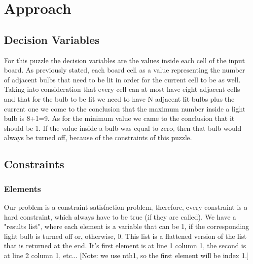 \documentclass[runningheads]{llncs}
\begin{document}
\section{Approach}

\subsection{Decision Variables}
For this puzzle the decision variables are the values inside each cell of the input board. As previously stated, each board cell as a value representing the number of adjacent bulbs that need to be lit in order for the current cell to be as well.
Taking into consideration that every cell can at most have eight adjacent cells and that for the bulb to be lit we need to have N adjacent lit bulbs plus the current one we come to the conclusion that the maximum number inside a light bulb is 8+1=9. As for the minimum value we came to the conclusion that it should be 1. If the value inside a bulb was equal to zero, then that bulb would always be turned off, because of the constraints of this puzzle.

\subsection{Constraints}
\subsubsection{Elements} \hfill \break
Our problem is a constraint satisfaction problem, therefore, every constraint is a hard constraint, which always have to be true (if they are called).
We have a "results list", where each element is a variable that can be 1, if the corresponding light bulb is turned off or, otherwise, 0. This list is a flattened version of the list that is returned at the end. It's first element is at line 1 column 1, the second is at line 2 column 1, etc...
[Note: we use nth1, so the first element will be index 1.]
\end{document}
